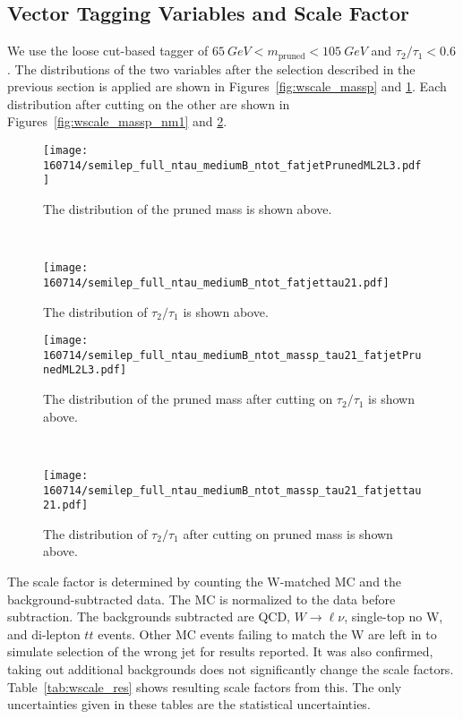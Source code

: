 \documentclass{article}
\begin{document}
\subsection{Vector Tagging Variables and Scale Factor} \label{sec:wscale_tagging}

We use the loose cut-based tagger of $\SI{65}{GeV} < m_\text{pruned} < \SI{105}{GeV}$
and $\tau_2/\tau_1 < 0.6$.
The distributions of the two variables after the selection described
in the previous section is applied are shown in
Figures~\ref{fig:wscale_massp} and \ref{fig:wscale_tau21}.
Each distribution after cutting on the other are shown in
Figures~\ref{fig:wscale_massp_nm1} and \ref{fig:wscale_tau21_nm1}.
  
\begin{figure}[h]
  \centering
  \begin{minipage}{0.49\linewidth}
    \centering
    \texttt{[image: 160714/semilep\_full\_ntau\_mediumB\_ntot\_fatjetPrunedML2L3.pdf]}
    \caption{The distribution of the pruned mass is shown above.}
    \label{fig:wscale_massp}
  \end{minipage}
  ~
  \begin{minipage}{0.49\linewidth}
    \centering
    \texttt{[image: 160714/semilep\_full\_ntau\_mediumB\_ntot\_fatjettau21.pdf]}
    \caption{The distribution of $\tau_2/\tau_1$ is shown above.}
    \label{fig:wscale_tau21}
  \end{minipage}
\end{figure}

\begin{figure}[h]
  \centering
  \begin{minipage}{0.49\linewidth}
    \centering
    \texttt{[image: 160714/semilep\_full\_ntau\_mediumB\_ntot\_massp\_tau21\_fatjetPrunedML2L3.pdf]}
    \caption{The distribution of the pruned mass after cutting on $\tau_2/\tau_1$ is shown above.}
    \label{fig:wscale_massp_nm1}
  \end{minipage}
  ~
  \begin{minipage}{0.49\linewidth}
    \centering
    \texttt{[image: 160714/semilep\_full\_ntau\_mediumB\_ntot\_massp\_tau21\_fatjettau21.pdf]}
    \caption{The distribution of $\tau_2/\tau_1$ after cutting on pruned mass is shown above.}
    \label{fig:wscale_tau21_nm1}
  \end{minipage}
\end{figure}

The scale factor is determined by counting the W-matched MC and the background-subtracted data.
The MC is normalized to the data before subtraction.
The backgrounds subtracted are QCD, $W\rightarrow \ell\nu$, single-top no W, and 
di-lepton $tt$ events.
Other MC events failing to match the W are left in to simulate selection of the wrong jet
for results reported.
It was also confirmed, taking out additional backgrounds does not significantly 
change the scale factors.
Table~\ref{tab:wscale_res} shows resulting scale factors from this.
The only uncertainties given in these tables 
are the statistical uncertainties.
\end{document}
